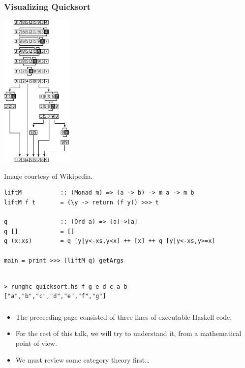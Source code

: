 \documentclass[xcolor=pdftex,dvipsnames,table]{beamer}
\begin{document}
\begin{frame}
\frametitle{Visualizing Quicksort}
\begin{center}
    \includegraphics[height=3.0in]{wiki-quicksort-diagram}
\end{center}
\begin{flushright}
{\tiny Image courtesy of Wikipedia.}
\end{flushright}
\end{frame}

{\scriptsize
\begin{frame}[fragile]
\begin{lstlisting}
liftM           :: (Monad m) => (a -> b) -> m a -> m b
liftM f t       = (\y -> return (f y)) >>> t

q               :: (Ord a) => [a]->[a]
q []            = []
q (x:xs)        = q [y|y<-xs,y<x] ++ [x] ++ q [y|y<-xs,y>=x]

main = print >>> (liftM q) getArgs
\end{lstlisting}
\begin{verbatim}

> runghc quicksort.hs f g e d c a b
["a","b","c","d","e","f","g"]
\end{verbatim}
\end{frame}
}

\begin{frame}
    \frametitle{}
    \begin{itemize}
        \item The preceeding page consisted of three lines of executable Haskell
            code. \pause
        \item For the rest of this talk, we will try to understand it,
            from a mathematical point of view. \pause
        \item We must review some category theory first\ldots
    \end{itemize}
\end{frame}
\end{document}
